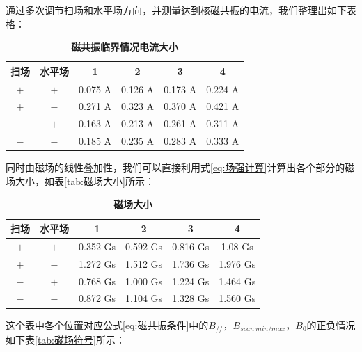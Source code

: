 \documentclass[10pt,hyperref,a4paper,UTF8]{ctexart}
\newcommand{\pll}{/\!/}
\begin{document}
                通过多次调节扫场和水平场方向，并测量达到核磁共振的电流，我们整理出如下表格：
                
                \begin{table}[htbp]
                        \caption{\textbf{磁共振临界情况电流大小}}
                        \setlength{\tabcolsep}{0.6cm}
                        \centering
                        \begin{tabular}{cccccc}
                        \toprule
                        扫场&水平场&1&2&3&4 \\
                        \midrule
                        $+$&$+$& 0.075 A & 0.126 A & 0.173 A & 0.224 A \\
                        $+$&$-$& 0.271 A & 0.323 A & 0.370 A & 0.421 A \\
                        $-$&$+$& 0.163 A & 0.213 A & 0.261 A & 0.311 A \\
                        $-$&$-$& 0.185 A & 0.235 A & 0.283 A & 0.333 A \\
                        \bottomrule
                        \end{tabular}
                \end{table}\label{tab:磁共振临界情况电流大小}

        同时由磁场的线性叠加性，我们可以直接利用式\ref{eq:场强计算}计算出各个部分的磁场大小，如表\ref{tab:磁场大小}所示：
                \begin{table}[htbp]
                        \caption{\textbf{磁场大小}}
                        \setlength{\tabcolsep}{0.6cm}
                        \centering
                        \begin{tabular}{cccccc}
                        \toprule
                        扫场&水平场&1&2&3&4 \\
                        \midrule
                        $+$&$+$& 0.352 Gs & 0.592 Gs & 0.816 Gs & 1.08 Gs \\
                        $+$&$-$& 1.272 Gs & 1.512 Gs & 1.736 Gs & 1.976 Gs \\
                        $-$&$+$& 0.768 Gs & 1.000 Gs & 1.224 Gs & 1.464 Gs \\
                        $-$&$-$& 0.872 Gs & 1.104 Gs & 1.328 Gs & 1.560 Gs \\                \bottomrule
                        \end{tabular}
                \end{table}\label{tab:磁场大小}
                这个表中各个位置对应公式\ref{eq:磁共振条件}中的$B_{\pll}$，$B_{scan\ min/max}$，$B_{0}$的正负情况如下表\ref{tab:磁场符号}所示：
\end{document}
